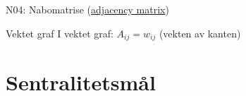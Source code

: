 \documentclass[aspectratio=169, 10pt]{beamer}
\begin{document}
\begin{frame}{N04: Nabomatrise (\href{https://en.wikipedia.org/wiki/Adjacency_matrix}{adjacency matrix})}
    \vspace{3mm}
    
    \begin{block}{Vektet graf}
        I vektet graf: $A_{ij} = w_{ij}$ (vekten av kanten)
    \end{block}
    
\end{frame}

\section{Sentralitetsmål}

\end{document}
